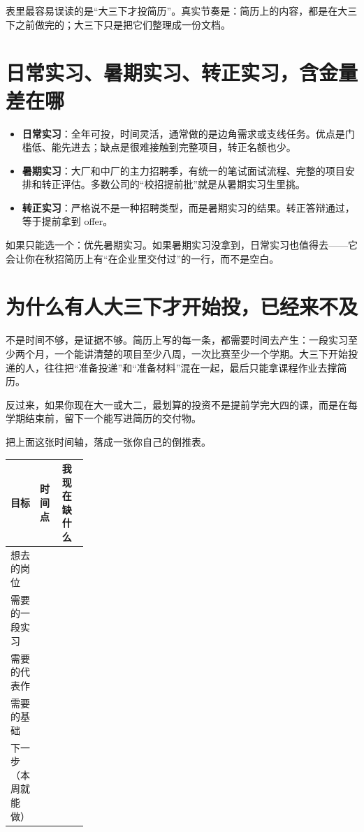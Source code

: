 \documentclass[UTF8,zihao=5,openany]{ctexbook}
\begin{document}
表里最容易误读的是“大三下才投简历”。真实节奏是：简历上的内容，都是在大三下之前做完的；大三下只是把它们整理成一份文档。

\section{日常实习、暑期实习、转正实习，含金量差在哪}
\begin{itemize}
\item \textbf{日常实习}：全年可投，时间灵活，通常做的是边角需求或支线任务。优点是门槛低、能先进去；缺点是很难接触到完整项目，转正名额也少。
\item \textbf{暑期实习}：大厂和中厂的主力招聘季，有统一的笔试面试流程、完整的项目安排和转正评估。多数公司的“校招提前批”就是从暑期实习生里挑。
\item \textbf{转正实习}：严格说不是一种招聘类型，而是暑期实习的结果。转正答辩通过，等于提前拿到 offer。
\end{itemize}

如果只能选一个：优先暑期实习。如果暑期实习没拿到，日常实习也值得去——它会让你在秋招简历上有“在企业里交付过”的一行，而不是空白。

\section{为什么有人大三下才开始投，已经来不及}
不是时间不够，是证据不够。简历上写的每一条，都需要时间去产生：一段实习至少两个月，一个能讲清楚的项目至少八周，一次比赛至少一个学期。大三下开始投递的人，往往把“准备投递”和“准备材料”混在一起，最后只能拿课程作业去撑简历。

反过来，如果你现在大一或大二，最划算的投资不是提前学完大四的课，而是在每学期结束前，留下一个能写进简历的交付物。

把上面这张时间轴，落成一张你自己的倒推表。
\begin{toolbox}
\begin{center}\small
\begin{tabularx}{0.92\linewidth}{p{0.22\linewidth}YY}
\toprule
目标 & 时间点 & 我现在缺什么 \\
\midrule
想去的岗位 & & \\
需要的一段实习 & & \\
需要的代表作 & & \\
需要的基础 & & \\
下一步（本周就能做） & & \\
\bottomrule
\end{tabularx}
\end{center}
\end{toolbox}
\end{document}
